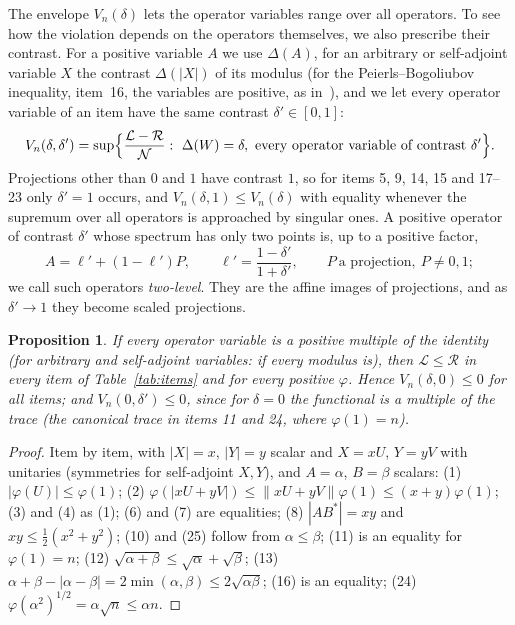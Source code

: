 \documentclass[11pt]{article}
\newcommand{\cL}{\mathcal{L}}
\newcommand{\cR}{\mathcal{R}}
\newcommand{\cN}{\mathcal{N}}
\theoremstyle{plain}
\newtheorem{proposition}[theorem]{Proposition}
\theoremstyle{definition}
\theoremstyle{remark}
\begin{document}
The envelope $V_n(\delta)$ lets the operator variables range over all operators. To see how the violation depends on
the operators themselves, we also prescribe their contrast. For a positive variable $A$ we use $\Delta(A)$, for an
arbitrary or self-adjoint variable $X$ the contrast $\Delta(|X|)$ of its modulus (for the Peierls--Bogoliubov
inequality, item~16, the variables are positive, as in~\cite{bikchentaev2011pb}), and we let every operator variable of
an item have the same contrast $\delta'\in[0,1]$:
\[
  V_n(\delta,\delta')=\sup\Bigl\{\frac{\cL-\cR}{\cN}:\ \Delta(W)=\delta,\ \text{every operator variable of contrast }\delta'\Bigr\}.
\]
Projections other than $0$ and $1$ have contrast $1$, so for items 5, 9, 14, 15 and 17--23 only $\delta'=1$ occurs, and
$V_n(\delta,1)\le V_n(\delta)$ with equality whenever the supremum over all operators is approached by singular ones.
A positive operator of contrast $\delta'$ whose spectrum has only two points is, up to a positive factor,
\[
  A=\ell'+(1-\ell')P,\qquad \ell'=\frac{1-\delta'}{1+\delta'},\qquad P\ \text{a projection},\ P\ne0,1;
\]
we call such operators \emph{two-level}. They are the affine images of projections, and as $\delta'\to1$ they become
scaled projections.

\begin{proposition}\label{prop:scalar}
If every operator variable is a positive multiple of the identity (for arbitrary and self-adjoint variables: if every
modulus is), then $\cL\le\cR$ in every item of Table~\ref{tab:items} and for every positive $\varphi$. Hence
$V_n(\delta,0)\le0$ for all items; and $V_n(0,\delta')\le0$, since for $\delta=0$ the functional is a multiple of the trace
(the canonical trace in items 11 and 24, where $\varphi(1)=n$).
\end{proposition}
\begin{proof}
Item by item, with $|X|=x$, $|Y|=y$ scalar and $X=xU$, $Y=yV$ with unitaries (symmetries for self-adjoint $X,Y$), and
$A=\alpha$, $B=\beta$ scalars: (1) $|\varphi(U)|\le\varphi(1)$; (2) $\varphi(|xU+yV|)\le\|xU+yV\|\varphi(1)\le(x+y)\varphi(1)$; (3) and (4)
as (1); (6) and (7) are equalities; (8) $|AB^*|=xy$ and $xy\le\frac12(x^2+y^2)$; (10) and (25) follow from $\alpha\le\beta$; (11) is an
equality for $\varphi(1)=n$; (12) $\sqrt{\alpha+\beta}\le\sqrt\alpha+\sqrt\beta$; (13) $\alpha+\beta-|\alpha-\beta|=2\min(\alpha,\beta)\le2\sqrt{\alpha\beta}$; (16) is an equality;
(24) $\varphi(\alpha^2)^{1/2}=\alpha\sqrt n\le\alpha n$.
\end{proof}
\end{document}
